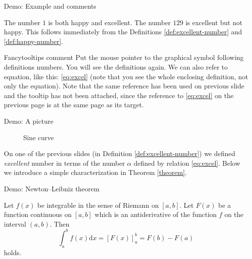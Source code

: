 \documentclass[envcountsect,t,10pt]{beamer}
\def\dx{{\mathrm d}x}
\begin{document}
\begin{frame}{Demo: Example and comments}
\begin{example}
  The number $1$ is both happy and excellent. The number $129$ is
  excellent but not happy. This follows immediately from the
  Definitions \ref{def:excellent-number} and \ref{def:happy-number}.
\end{example}
\begin{alertblock}{Fancytooltips comment}
  Put the mouse pointer to the graphical symbol following definitions
  numbers. You will see the definitions again. We can also refer to
  equation, like this: \eqref{eq:excel} (note that you see the whole
  enclosing definition, not only the equation). Note that the same
  reference has been used on previous slide and the tooltip has not
  been attached, since the reference to \eqref{eq:excel} on the
  previous page is at the same page as its target.
\end{alertblock}
\end{frame}


\begin{frame}{Demo: A picture}
  \begin{figure}
    \centering
{}
    \caption{Sine curve}
    \label{pic:sine}
  \end{figure}

  On one of the previous slides (in Definition \ref{def:excellent-number}) 
  we defined \textit{excellent} number in terms of the number $\alpha$
  defined by relation \eqref{eq:excel}. Below we introduce a simple
  characterization in Theorem \ref{theorem}.
\end{frame}

\begin{frame}{Demo: Newton--Leibniz theorem}
  
  \begin{theorem}
    Let $f(x)$ be integrable in the sense of Riemann on $[a,b]$. Let
    $F(x)$ be a function continuous on $[a,b]$ which is an
    antiderivative of the function $f$ on the interval $(a,b)$. Then
    \begin{equation*}
      \int_a^bf(x)\dx=[F(x)]_a^b=F(b)-F(a)
    \end{equation*}
    holds.\label{th:NL}
  \end{theorem}
\end{frame}
\end{document}
